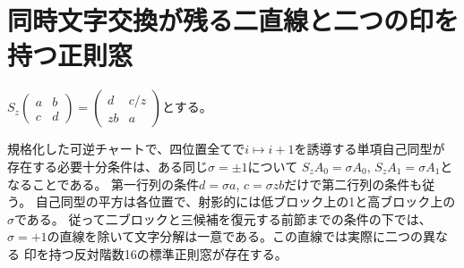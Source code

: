 \section{同時文字交換が残る二直線と二つの印を持つ正則窓}
\label{sec:flip-character-locus}
$S_z\left(\begin{smallmatrix}a&b\\c&d\end{smallmatrix}\right)
=\left(\begin{smallmatrix}d&c/z\\zb&a\end{smallmatrix}\right)$とする。
\begin{theorem}\label{thm:simultaneous-character-flip}
規格化した可逆チャートで、四位置全てで$i\mapsto i+1$を誘導する単項自己同型が
存在する必要十分条件は、ある同じ$\sigma=\pm1$について
$S_z A_0=\sigma A_0$, $S_z A_1=\sigma A_1$となることである。
第一行列の条件$d=\sigma a$, $c=\sigma zb$だけで第二行列の条件も従う。
自己同型の平方は各位置で、射影的には低ブロック上の1と高ブロック上の$\sigma$である。
従って二ブロックと三候補を復元する前節までの条件の下では、
$\sigma=+1$の直線を除いて文字分解は一意である。この直線では実際に二つの異なる
印を持つ反対階数16の標準正則窓が存在する。
\end{theorem}
